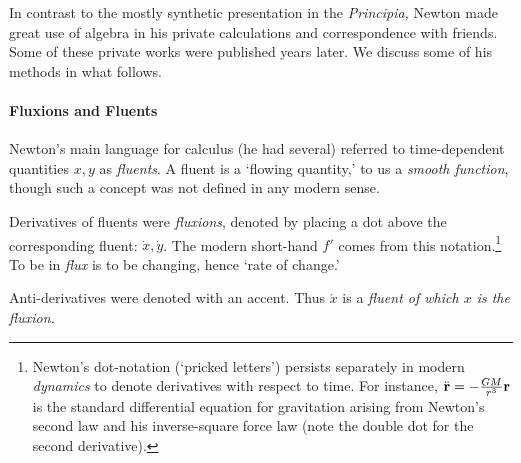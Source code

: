 In contrast to the mostly synthetic presentation in the \emph{Principia,} Newton made great use of algebra in his private calculations and correspondence with friends. Some of these private works were published years later. We discuss some of his methods in what follows.


\pagebreak[3]


\paragraph{Fluxions and Fluents}

Newton's main language for calculus (he had several) referred to time-dependent quantities $x,y$ as \emph{fluents}. A fluent is a `flowing quantity,' to us a \emph{smooth function}, though such a concept was not defined in any modern sense.
\smallbreak

Derivatives of fluents were \emph{fluxions}, denoted by placing a dot above the corresponding fluent: $\dot x,\dot y$. The modern short-hand $f'$ comes from this notation.\footnote{%
	 Newton's dot-notation (`pricked letters') persists separately in modern \emph{dynamics} to denote derivatives with respect to time. For instance, $\ddot{{\mathbf{r}}}=-\frac{GM}{r^3}{\mathbf{r}}$ is the standard differential equation for gravitation arising from Newton's second law and his inverse-square force law (note the double dot for the second derivative).
}
To be in \emph{flux} is to be changing, hence `rate of change.'
\smallbreak

Anti-derivatives were denoted with an accent. Thus $\acute{x}$ is a \emph{fluent of which $x$ is the fluxion.}
\bigbreak

